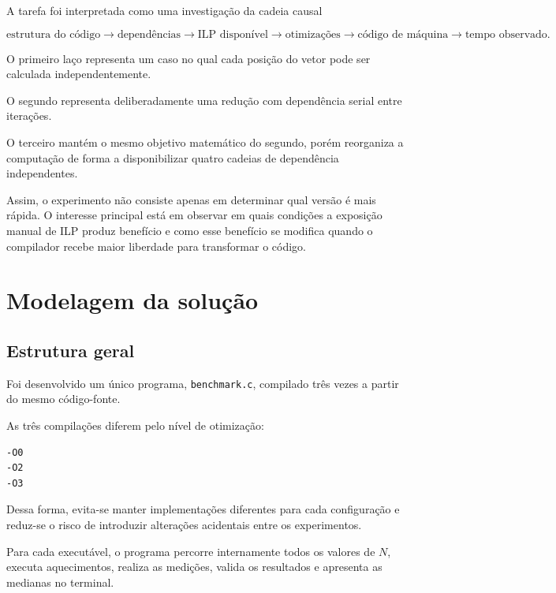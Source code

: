 A tarefa foi interpretada como uma investigação da cadeia causal

\begin{equation}
\text{estrutura do código}
\rightarrow
\text{dependências}
\rightarrow
\text{ILP disponível}
\rightarrow
\text{otimizações}
\rightarrow
\text{código de máquina}
\rightarrow
\text{tempo observado}.
\end{equation}

O primeiro laço representa um caso no qual cada posição do vetor pode ser calculada
independentemente.

O segundo representa deliberadamente uma redução com dependência serial entre iterações.

O terceiro mantém o mesmo objetivo matemático do segundo, porém reorganiza a computação de
forma a disponibilizar quatro cadeias de dependência independentes.

Assim, o experimento não consiste apenas em determinar qual versão é mais rápida. O interesse
principal está em observar em quais condições a exposição manual de ILP produz benefício e
como esse benefício se modifica quando o compilador recebe maior liberdade para transformar
o código.


\section{Modelagem da solução}

\label{sec:atvd02-modelagem}

\subsection{Estrutura geral}

Foi desenvolvido um único programa, \texttt{benchmark.c}, compilado três vezes a partir do
mesmo código-fonte.

As três compilações diferem pelo nível de otimização:

\begin{verbatim}
-O0
-O2
-O3
\end{verbatim}

Dessa forma, evita-se manter implementações diferentes para cada configuração e reduz-se o
risco de introduzir alterações acidentais entre os experimentos.

Para cada executável, o programa percorre internamente todos os valores de \(N\), executa
aquecimentos, realiza as medições, valida os resultados e apresenta as medianas no terminal.


